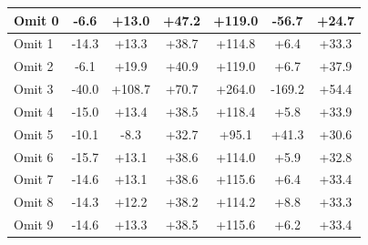 \begin{table}[!h]
\begin{center}
\begin{tabular}[h]{|l||c|c|c|c|c||c|}
Omit 0& -6.6& +13.0& +47.2& +119.0& -56.7& +24.7\\\hline
Omit 1& -14.3& +13.3& +38.7& +114.8& +6.4& +33.3\\\hline
Omit 2& -6.1& +19.9& +40.9& +119.0& +6.7& +37.9\\\hline
{\color{Gray}Omit 3}&{\color{Gray} -40.0}&{\color{Gray} +108.7}&{\color{Gray} +70.7}&{\color{Gray} +264.0}&{\color{Gray} -169.2}&{\color{Gray} +54.4}\\\hline
Omit 4& -15.0& +13.4& +38.5& +118.4& +5.8& +33.9\\\hline
Omit 5& -10.1& -8.3& +32.7& +95.1& +41.3& +30.6\\\hline
Omit 6& -15.7& +13.1& +38.6& +114.0& +5.9& +32.8\\\hline
Omit 7& -14.6& +13.1& +38.6& +115.6& +6.4& +33.4\\\hline
Omit 8& -14.3& +12.2& +38.2& +114.2& +8.8& +33.3\\\hline
Omit 9& -14.6& +13.3& +38.5& +115.6& +6.2& +33.4\\\hline
\end{tabular}
\end{center}
\label{tab:run1_null_corrections_table}
\end{table}

